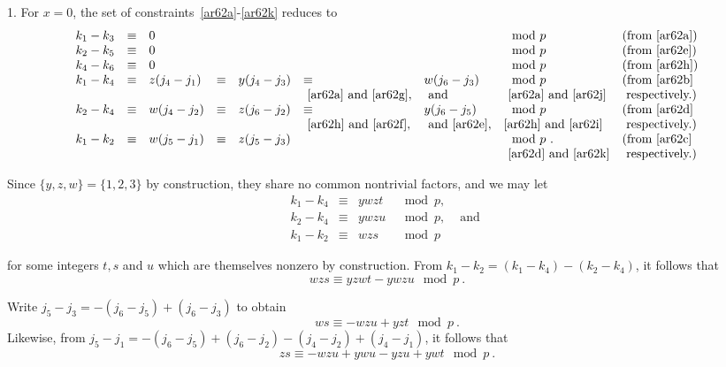 1. For $x=0$, the set of constraints~\eqref{ar62a}-\eqref{ar62k}
reduces to
\begin{equation}\begin{array}{llllllllllll}
k_1-k_3 &\equiv& 0 & {}& {}&{}&{}&\mod p &\text{(from
\eqref{ar62a})}
\\
k_2-k_5 &\equiv& 0 & {}& {}&{}&{}&\mod p&\text{(from \eqref{ar62e})}
\\
k_4-k_6 &\equiv& 0 & {}& {}&{}&{}&\mod p&\text{(from \eqref{ar62h})}
\\ k_1-k_4 &\equiv&
z(j_4-j_1)& \equiv& y(j_4-j_3)& \equiv& w(j_6-j_3) &\mod p&\text{(from \eqref{ar62b}}\\
&{}&{}&{}& {}&\text{ \eqref{ar62a} and \eqref{ar62g}},&\text{ and}
&\text{ \eqref{ar62a} and \eqref{ar62j}}&\text{ respectively.)}
\\
k_2-k_4 &\equiv& w(j_4-j_2) &\equiv&  z(j_6-j_2) &\equiv& y(j_6-j_5)
&\mod p&\text{(from
\eqref{ar62d}}\\
&{}&{}&{}& {}&\text{ \eqref{ar62h} and \eqref{ar62f}},&\text{
and{}{} \eqref{ar62e}},&\text{\eqref{ar62h} and
\eqref{ar62i}}&\text{ respectively.)}
\\
k_1-k_2 &\equiv& w(j_5-j_1) &\equiv& z(j_5-j_3) & {}&{}&\mod p~.
&\text{(from \eqref{ar62c}}\\
&{}&{}&{}&{}&{}& {}&\text{ \eqref{ar62d} and \eqref{ar62k}}&\text{
respectively.})
\end{array}\end{equation}

Since $\{y,z,w\}=\{1,2,3\}$ by construction, they share no common
nontrivial factors, and we may let
\begin{equation}\begin{array}{ccccc}k_1-k_4 &\equiv& ywzt &\mod p, &{} \\
k_2-k_4 &\equiv& ywzu &\mod p, &\text{ and }\\k_1-k_2 &\equiv& wzs
&\mod p&{}
\end{array}\end{equation}

for some integers $t,s$ and $u$ which are themselves nonzero by
construction. From $k_1-k_2=(k_1-k_4)-(k_2-k_4)$, it follows that
\begin{equation}\label{eq621}
wzs \equiv yzwt -ywzu \mod p~.
\end{equation}

Write $j_5-j_3=-(j_6-j_5)+(j_6-j_3)$ to obtain
\begin{equation}\label{eq622}
ws \equiv -wzu +yzt \mod p~.
\end{equation}
Likewise, from $j_5-j_1=-(j_6-j_5)+(j_6-j_2)-(j_4-j_2)+(j_4-j_1)$,
it follows that
\begin{equation}\label{eq623}
zs \equiv -wzu +ywu -yzu +ywt \mod p~.
\end{equation}

